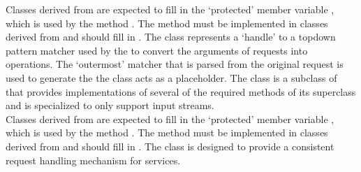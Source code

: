 Classes derived from  are expected to
fill in the `protected' member variable , which
is used by the method .
The method  must be implemented in classes derived from
 and should fill in
.
The  class represents a
`handle' to a top\longDash{}down pattern matcher used by the
 to convert the arguments of
 requests into 
operations.
The `outermost' matcher that is parsed from the original request is used to generate the
 \longDash{} the  class acts as a
placeholder.
The 
class is a subclass of 
that provides implementations of several of the required methods of its superclass and is
specialized to only support input streams.\\

Classes derived from  are expected to
fill in the `protected' member variable , which is
used by the method .
The method  must be implemented in classes derived from
 and should fill in
.
The  class is
designed to provide a consistent request handling mechanism for \mplusm{} services.\\

